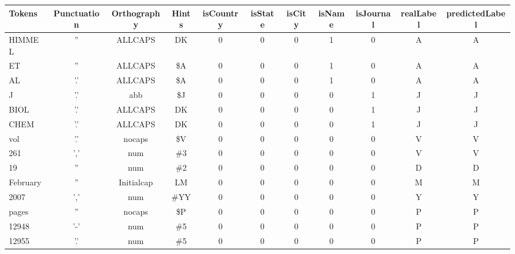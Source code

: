 {
\sffamily


\begin{tabular}{l *{10}{c}}
 \textbf{Tokens} & \textbf{Punctuation} & \textbf{Orthography} & \textbf{Hints} & \textbf{isCountry} &   \textbf{isState} & \textbf{isCity}  & \textbf{isName} &  \textbf{isJournal} & \textbf{ realLabel} & \textbf{predictedLabel}\\
\hline
HIMMEL  & '' & ALLCAPS    & DK  & 0 & 0 & 0 & 1 & 0 & A & A\\
ET      & '' & ALLCAPS    & \$A & 0 & 0 & 0 & 1 & 0 & A & A\\
AL      &'.' & ALLCAPS    & \$A & 0 & 0 & 0 & 1 & 0 & A & A\\
J       &'.' & abb        & \$J & 0 & 0 & 0 & 0 & 1 & J & J\\
BIOL    &'.' & ALLCAPS    & DK  & 0 & 0 & 0 & 0 & 1 & J & J\\
CHEM    &'.' & ALLCAPS    & DK  & 0 & 0 & 0 & 0 & 1 & J & J\\
vol     &'.' & nocaps     &\$V  & 0 & 0 & 0 & 0 & 0 & V & V\\
261     &',' & num        &\#3  & 0 & 0 & 0 & 0 & 0 & V & V\\
19      &''  & num        &\#2  & 0 & 0 & 0 & 0 & 0 & D & D\\
February& '' & Initialcap & LM  & 0 & 0 & 0 & 0 & 0 & M & M\\
2007    &',' & num        &\#YY & 0 & 0 & 0 & 0 & 0 & Y & Y\\
pages   &''  & nocaps     &\$P  & 0 & 0 & 0 & 0 & 0 & P & P\\
12948   &'-' & num        &\#5  & 0 & 0 & 0 & 0 & 0 & P & P\\
12955   &'.' & num        &\#5  & 0 & 0 & 0 & 0 & 0 & P & P\\

\end{tabular}


}
